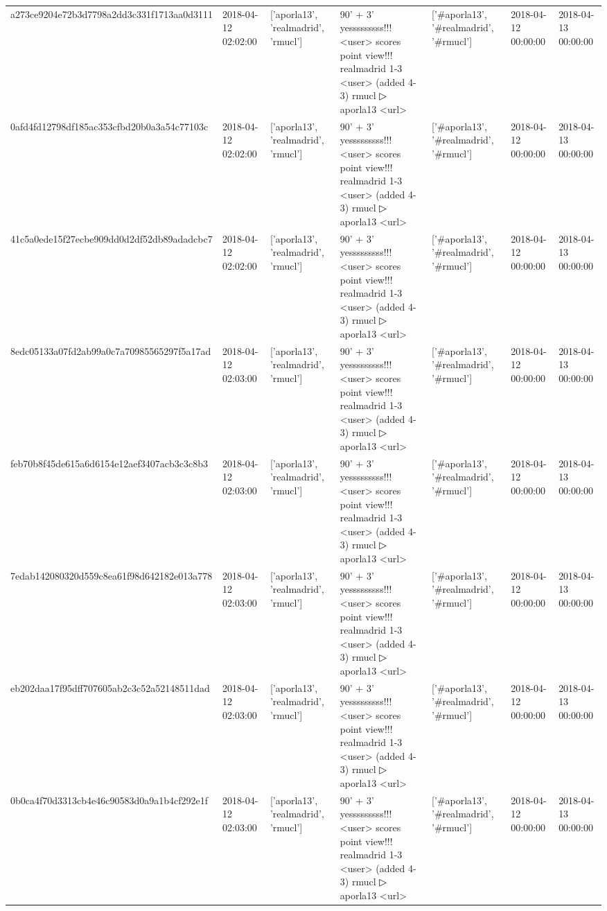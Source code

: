 \begin{tabular}{lllllll}
a273ce9204e72b3d7798a2dd3c331f1713aa0d3111 & 2018-04-12 02:02:00 & ['aporla13', 'realmadrid', 'rmucl'] & 90' + 3' yesssssssss!!! <user> scores point view!!! realmadrid 1-3 <user> (added 4-3) rmucl ▷ aporla13 <url> & ['#aporla13', '#realmadrid', '#rmucl'] & 2018-04-12 00:00:00 & 2018-04-13 00:00:00 \\
0afd4fd12798df185ac353cfbd20b0a3a54c77103c & 2018-04-12 02:02:00 & ['aporla13', 'realmadrid', 'rmucl'] & 90' + 3' yesssssssss!!! <user> scores point view!!! realmadrid 1-3 <user> (added 4-3) rmucl ▷ aporla13 <url> & ['#aporla13', '#realmadrid', '#rmucl'] & 2018-04-12 00:00:00 & 2018-04-13 00:00:00 \\
41c5a0ede15f27ecbe909dd0d2df52db89adadcbc7 & 2018-04-12 02:02:00 & ['aporla13', 'realmadrid', 'rmucl'] & 90' + 3' yesssssssss!!! <user> scores point view!!! realmadrid 1-3 <user> (added 4-3) rmucl ▷ aporla13 <url> & ['#aporla13', '#realmadrid', '#rmucl'] & 2018-04-12 00:00:00 & 2018-04-13 00:00:00 \\
8edc05133a07fd2ab99a0c7a70985565297f5a17ad & 2018-04-12 02:03:00 & ['aporla13', 'realmadrid', 'rmucl'] & 90' + 3' yesssssssss!!! <user> scores point view!!! realmadrid 1-3 <user> (added 4-3) rmucl ▷ aporla13 <url> & ['#aporla13', '#realmadrid', '#rmucl'] & 2018-04-12 00:00:00 & 2018-04-13 00:00:00 \\
feb70b8f45de615a6d6154e12aef3407acb3c3c8b3 & 2018-04-12 02:03:00 & ['aporla13', 'realmadrid', 'rmucl'] & 90' + 3' yesssssssss!!! <user> scores point view!!! realmadrid 1-3 <user> (added 4-3) rmucl ▷ aporla13 <url> & ['#aporla13', '#realmadrid', '#rmucl'] & 2018-04-12 00:00:00 & 2018-04-13 00:00:00 \\
7edab142080320d559c8ea61f98d642182e013a778 & 2018-04-12 02:03:00 & ['aporla13', 'realmadrid', 'rmucl'] & 90' + 3' yesssssssss!!! <user> scores point view!!! realmadrid 1-3 <user> (added 4-3) rmucl ▷ aporla13 <url> & ['#aporla13', '#realmadrid', '#rmucl'] & 2018-04-12 00:00:00 & 2018-04-13 00:00:00 \\
eb202daa17f95dff707605ab2c3c52a52148511dad & 2018-04-12 02:03:00 & ['aporla13', 'realmadrid', 'rmucl'] & 90' + 3' yesssssssss!!! <user> scores point view!!! realmadrid 1-3 <user> (added 4-3) rmucl ▷ aporla13 <url> & ['#aporla13', '#realmadrid', '#rmucl'] & 2018-04-12 00:00:00 & 2018-04-13 00:00:00 \\
0b0ca4f70d3313cb4e46c90583d0a9a1b4cf292e1f & 2018-04-12 02:03:00 & ['aporla13', 'realmadrid', 'rmucl'] & 90' + 3' yesssssssss!!! <user> scores point view!!! realmadrid 1-3 <user> (added 4-3) rmucl ▷ aporla13 <url> & ['#aporla13', '#realmadrid', '#rmucl'] & 2018-04-12 00:00:00 & 2018-04-13 00:00:00 \\

\end{tabular}
